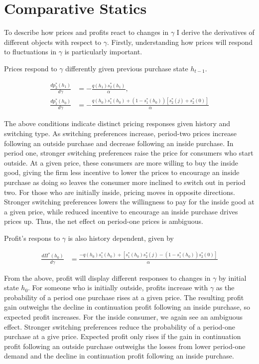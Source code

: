 \documentclass[12pt]{article}
\newtheorem{proposition}{Proposition}
\theoremstyle{definition}
\theoremstyle{remark}
\begin{document}
\section{Comparative Statics}
\label{sec:comparative-statics}

To describe how prices and profits react to changes in $\gamma$ I derive the derivatives of different objects with respect to $\gamma$. Firstly, understanding how prices will respond to fluctuations in $\gamma$ is particularly important.

  Prices respond to $\gamma$ differently given previous purchase state $h_{t-1}$.

\begin{align}
  \frac{dp_2^*(h_1)}{d\gamma} &= -\frac{q(h_1)s_2^*(h_1)}{\alpha}, \\
  \frac{dp_1^*(h_0)}{d\gamma} &= -\frac{q(h_0)s_1^*(h_0) + (1-s_1^*(h_0))[s_2^*(j) + s_2^*(0)]}{\alpha}
 \label{eq:supply-gamma-prices}
\end{align}

The above conditions indicate distinct pricing responses given history and switching type. As switching preferences increase, period-two prices increase following an outside purchase and decrease following an inside purchase. In period one, stronger switching preferences raise the price for consumers who start outside. At a given price, these consumers are more willing to buy the inside good, giving the firm less incentive to lower the prices to encourage an inside purchase as doing so leaves the consumer more inclined to switch out in period two. For those who are initially inside, pricing moves in opposite directions. Stronger switching preferences lowers the willingness to pay for the inside good at a given price, while reduced incentive to encourage an inside purchase drives prices up. Thus, the net effect on period-one prices is ambiguous.

Profit's respons to $\gamma$ is also history dependent, given by

\begin{align}
  \frac{d\Pi^*(h_0)}{d\gamma} &= \frac{-q(h_0)s_1^*(h_0) + [s_1^*(h_0)s_2^*(j) - (1-s_1^*(h_0))s_2^*(0)]}{\alpha}
\end{align}

From the above, profit will display different responses to changes in $\gamma$ by initial state $h_0$. For someone who is initially outside, profits increase with $\gamma$ as the probability of a period one purchase rises at a given price. The resulting profit gain outweighs the decline in continuation profit following an inside purchase, so expected profit increases. For the inside consumer, we again see an ambiguous effect. Stronger switching preferences reduce the probability of a period-one purchase at a give price. Expected profit only rises if the gain in continuation profit following an outside purchase outweighs the losses from lower period-one demand and the decline in continuation profit following an inside purchase.
\end{document}
